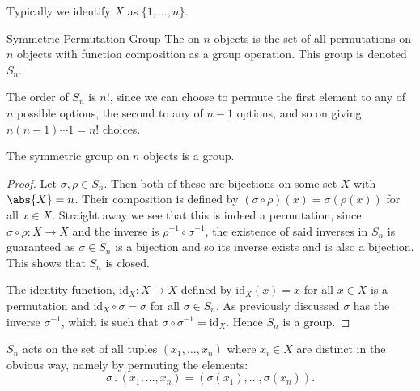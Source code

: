 \documentclass[fleqn]{NotesClass}
\newcommand*{\action}{\mathbin{.}}
\begin{document}
    Typically we identify \(X\) as \(\{1, \dotsc, n\}\).
    
    \begin{dfn}{Symmetric Permutation Group}{}
        The  on \(n\) objects is the set of all permutations on \(n\) objects with function composition as a group operation.
        This group is denoted \(S_n\).
    \end{dfn}

    The order of \(S_n\) is \(n!\), since we can choose to permute the first element to any of \(n\) possible options, the second to any of \(n - 1\) options, and so on giving \(n(n - 1) \dotsm 1 = n!\) choices.
    
    \begin{lma}{}{}
        The symmetric group on \(n\) objects is a group.
        \begin{proof}
            Let \(\sigma, \rho \in S_n\).
            Then both of these are bijections on some set \(X\) with \(\abs{X} = n\).
            Their composition is defined by \((\sigma \circ \rho)(x) = \sigma(\rho(x))\) for all \(x \in X\).
            Straight away we see that this is indeed a permutation, since \(\sigma \circ \rho \colon X \to X\) and the inverse is \(\rho^{-1} \circ \sigma^{-1}\), the existence of said inverses in \(S_n\) is guaranteed as \(\sigma \in S_n\) is a bijection and so its inverse exists and is also a bijection.
            This shows that \(S_n\) is closed.
            
            The identity function, \(\mathrm{id}_X \colon X \to X\) defined by \(\mathrm{id}_X(x) = x\) for all \(x \in X\) is a permutation and \(\mathrm{id}_X \circ \sigma = \sigma\) for all \(\sigma \in S_n\).
            As previously discussed \(\sigma\) has the inverse \(\sigma^{-1}\), which is such that \(\sigma\circ \sigma^{-1} = \mathrm{id}_X\).
            Hence \(S_n\) is a group.
        \end{proof}
    \end{lma}
    
    \(S_n\) acts on the set of all tuples \((x_1, \dotsc, x_n)\) where \(x_i \in X\) are distinct in the obvious way, namely by permuting the elements:
    \begin{equation}
        \sigma \action (x_1, \dotsc, x_n) = (\sigma(x_1), \dotsc, \sigma(x_n)).
    \end{equation}
    
\end{document}
